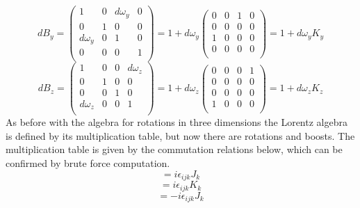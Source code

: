 \begin{equation}
dB_y = 
\begin{pmatrix}
1 & 0 & d\omega_y & 0 \\
0 & 1 & 0 & 0 \\
d\omega_y & 0 & 1 & 0 \\
0 & 0 & 0 & 1 \\
\end{pmatrix}
= 1 + d\omega_y
\begin{pmatrix}
0 & 0 & 1 & 0 \\
0 & 0 & 0 & 0 \\
1 & 0 & 0 & 0 \\
0 & 0 & 0 & 0 \\
\end{pmatrix}
= 1 + d\omega_y K_y
\end{equation}
\begin{equation}
dB_z = 
\begin{pmatrix}
1 & 0 & 0 & d\omega_z \\
0 & 1 & 0 & 0 \\
0 & 0 & 1 & 0 \\
d\omega_z & 0 & 0 & 1 \\
\end{pmatrix}
= 1 + d\omega_z
\begin{pmatrix}
0 & 0 & 0 & 1 \\
0 & 0 & 0 & 0 \\
0 & 0 & 0 & 0 \\
1 & 0 & 0 & 0 \\
\end{pmatrix}
= 1 + d\omega_z K_z
\end{equation}
As before with the algebra for rotations in three dimensions the Lorentz algebra is defined by its multiplication table, but now there are rotations and boosts. The multiplication table is given by the commutation relations below, which can be confirmed by brute force computation.  
\begin{equation}
[J_i, J_j] = i\epsilon_{ijk}J_k
\end{equation}
\begin{equation}
[J_i, K_j] = i\epsilon_{ijk}K_k
\end{equation}
\begin{equation}
[K_i, K_j] = -i\epsilon_{ijk}J_k
\end{equation}

